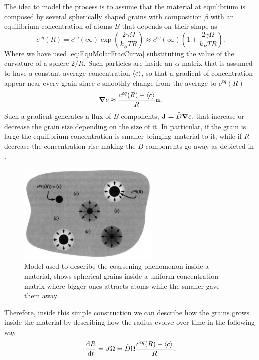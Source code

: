 The idea to model the process is to assume that the material at equilibrium is composed by several spherically shaped grains with composition $\beta$ with an equilibrium concentration of atoms $B$ that depends on their shape as
\begin{equation}
    \label{eq:EquiConc}
    c^{eq}(R) = c^{eq}(\infty) \exp\left( \frac{2\gamma\Omega}{k_BTR} \right) \approx c^{eq}(\infty)\left( 1 + \frac{2\gamma\Omega}{k_BTR} \right).
\end{equation}
Where we have used \eqref{eq:EquMolarFracCurva} substituting the value of the curvature of a sphere $2/R$. Such particles are inside an $\alpha$ matrix that is assumed to have a constant average concentration $\left\langle c \right\rangle$, so that a gradient of concentration appear near every grain since $c$ smoothly change from the average to $c^{eq}(R)$
\begin{equation}
    \grad c \approx \frac{c^{eq}(R) - \left\langle c \right\rangle}{R}\vb{n}.
\end{equation}
Such a gradient generates a flux of $B$ components, $\vb{J} = \tilde{D}\grad c$, that increase or decrease the grain size depending on the size of it. In particular, if the grain is large the equilibrium concentration is smaller bringing material to it, while if $R$ decrease the concentration rise making the $B$ components go away as depicted in .
\begin{figure}[t]
    \centering
    \includegraphics[width=0.6\textwidth]{Immagini/CoarsModel.png}
    \caption
    {
        Model used to describe the coarsening phenomenon inside a material, shows spherical grains inside a uniform concentration matrix where bigger ones attracts atoms while the smaller gave them away.
    }
    \label{fig:CoarsModel}
\end{figure}
Therefore, inside this simple construction we can describe how the grains grows inside the material by describing how the radius evolve over time in the following way
\begin{equation}
    \label{eq:rateOfChange}
    \dv{R}{t} = J\Omega = \tilde{D}\Omega\frac{c^{eq}(R) - \left\langle c \right\rangle}{R}.
\end{equation}
